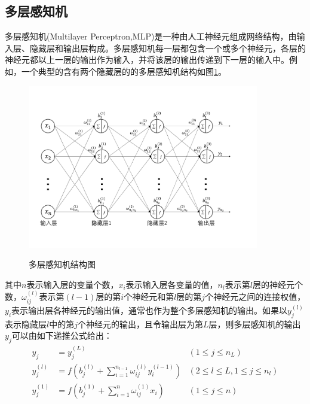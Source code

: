 \documentclass[a4paper]{ctexart}
\begin{document}
\begin{spacing}{1.3}
	\section{多层感知机}\label{sec:多层感知机}
	多层感知机(Multilayer Perceptron,MLP)是一种由人工神经元组成网络结构，由输入层、隐藏层和输出层构成。多层感知机每一层都包含一个或多个神经元，各层的神经元都以上一层的输出作为输入，并将该层的输出传递到下一层的输入中\cite{RN121}。例如，一个典型的含有两个隐藏层的的多层感知机结构如图\ref{figure:network}。
	\begin{figure}[htbp]
		\centering
		\includegraphics[width=0.9\textwidth, keepaspectratio]{figure/network.pdf}\\
		\caption{多层感知机结构图}\label{figure:network}
	\end{figure}\newline
	其中$n$表示输入层的变量个数，$x_i$表示输入层各变量的值，$n_l$表示第$l$层的神经元个数，$\omega_{ij}^{(l)}$表示第$(l-1)$层的第$i$个神经元和第$l$层的第$j$个神经元之间的连接权值，$y_i$表示输出层各神经元的输出值，通常也作为整个多层感知机的输出。如果以$y_j^{(l)}$表示隐藏层$l$中的第$j$个神经元的输出，且令输出层为第$L$层，则多层感知机的输出$y_j$可以由如下递推公式给出：
	\begin{equation}\label{eq:多层感知机数字形式}
		\begin{aligned}
				y_j&=y_j^{(L)}&(1\leq j\leq n_L)\\
				y_j^{(l)}&=f\left(b_j^{(l)}+\sum_{i=1}^{n_{l-1}}\omega_{ij}^{(l)}y_i^{(l-1)}\right)&(2\leq l\leq L,1\leq j\leq n_l)\\
				y_j^{(1)}&=f\left(b_j^{(1)}+\sum_{i=1}^n\omega_{ij}^{(1)}x_i\right)&(1\leq j\leq n)\\
		\end{aligned}
	\end{equation}

\end{spacing}
\end{document}
